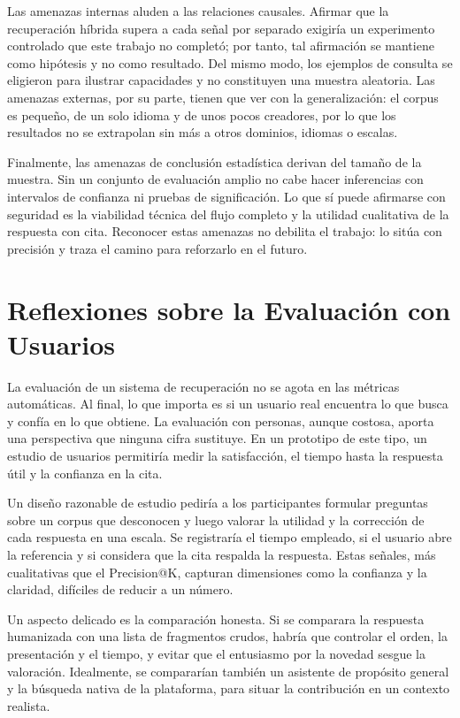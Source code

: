 \documentclass[12pt,a4paper]{article}
\begin{document}
Las amenazas internas aluden a las relaciones causales. Afirmar que la recuperación híbrida supera a cada señal por separado exigiría un experimento controlado que este trabajo no completó; por tanto, tal afirmación se mantiene como hipótesis y no como resultado. Del mismo modo, los ejemplos de consulta se eligieron para ilustrar capacidades y no constituyen una muestra aleatoria. Las amenazas externas, por su parte, tienen que ver con la generalización: el corpus es pequeño, de un solo idioma y de unos pocos creadores, por lo que los resultados no se extrapolan sin más a otros dominios, idiomas o escalas.

Finalmente, las amenazas de conclusión estadística derivan del tamaño de la muestra. Sin un conjunto de evaluación amplio no cabe hacer inferencias con intervalos de confianza ni pruebas de significación. Lo que sí puede afirmarse con seguridad es la viabilidad técnica del flujo completo y la utilidad cualitativa de la respuesta con cita. Reconocer estas amenazas no debilita el trabajo: lo sitúa con precisión y traza el camino para reforzarlo en el futuro.



\section{Reflexiones sobre la Evaluación con Usuarios}
\label{sec:evalusuarios}

La evaluación de un sistema de recuperación no se agota en las métricas automáticas. Al final, lo que importa es si un usuario real encuentra lo que busca y confía en lo que obtiene. La evaluación con personas, aunque costosa, aporta una perspectiva que ninguna cifra sustituye. En un prototipo de este tipo, un estudio de usuarios permitiría medir la satisfacción, el tiempo hasta la respuesta útil y la confianza en la cita.

Un diseño razonable de estudio pediría a los participantes formular preguntas sobre un corpus que desconocen y luego valorar la utilidad y la corrección de cada respuesta en una escala. Se registraría el tiempo empleado, si el usuario abre la referencia y si considera que la cita respalda la respuesta. Estas señales, más cualitativas que el Precision@K, capturan dimensiones como la confianza y la claridad, difíciles de reducir a un número.

Un aspecto delicado es la comparación honesta. Si se comparara la respuesta humanizada con una lista de fragmentos crudos, habría que controlar el orden, la presentación y el tiempo, y evitar que el entusiasmo por la novedad sesgue la valoración. Idealmente, se compararían también un asistente de propósito general y la búsqueda nativa de la plataforma, para situar la contribución en un contexto realista.
\end{document}
